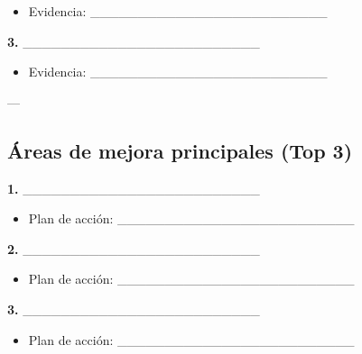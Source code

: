 \documentclass[a4paper,11pt]{article}
\begin{document}
\begin{itemize}

  \item Evidencia: _________________________

\end{itemize}

\vspace{0.2cm}

\textbf{3. } _________________________

\begin{itemize}

  \item Evidencia: _________________________

\end{itemize}

\vspace{0.2cm}

---

\vspace{0.2cm}

\subsection{Áreas de mejora principales (Top 3)}

\vspace{0.2cm}

\textbf{1. } _________________________

\begin{itemize}

  \item Plan de acción: _________________________

\end{itemize}

\vspace{0.2cm}

\textbf{2. } _________________________

\begin{itemize}

  \item Plan de acción: _________________________

\end{itemize}

\vspace{0.2cm}

\textbf{3. } _________________________

\begin{itemize}

  \item Plan de acción: _________________________

\end{itemize}
\end{document}
